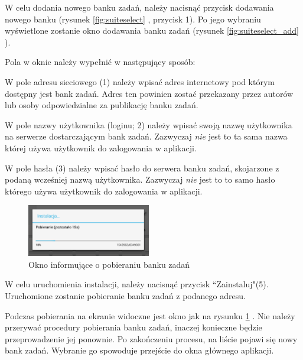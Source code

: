 \documentclass[a4paper,10pt,twosided]{book}
\newcommand{\refwithpage}[3]{
\ref{#1}\ifthenelse{\equal{\thepage}{\pageref{#1}}}{}{#2\pageref{#1}#3}%
}
\newcommand{\pref}[1]{\refwithpage{#1}{ (strona }{)}}
\newcommand{\ppref}[1]{\refwithpage{#1}{ -- strona }{}}
\begin{document}
W celu dodania nowego banku zadań, należy nacisnąć przycisk dodawania nowego banku (rysunek \ppref{fig:suiteselect}, przycisk 1). Po jego wybraniu wyświetlone zostanie okno dodawania banku zadań (rysunek \ppref{fig:suiteselect_add}).

Pola w oknie należy wypełnić w następujący sposób:

W pole adresu sieciowego (1) należy wpisać adres internetowy pod którym dostępny jest bank zadań. Adres ten powinien zostać przekazany przez autorów lub osoby odpowiedzialne za publikację banku zadań.

W pole nazwy użytkownika (loginu; 2) należy wpisać swoją nazwę użytkownika na serwerze dostarczającym bank zadań. Zazwyczaj \emph{nie} jest to ta sama nazwa której używa użytkownik do zalogowania w aplikacji.

W pole hasła (3) należy wpisać hasło do serwera banku zadań, skojarzone z podaną wcześniej nazwą użytkownika. Zazwyczaj \emph{nie} jest to to samo hasło którego używa użytkownik do zalogowania w aplikacji.

\begin{figure}
\vspace{-1em}
\includegraphics[width=0.48\textwidth]{activity_suite_select-installing.png}
\caption{Okno informujące o pobieraniu banku zadań}
\vspace{-1em}
\label{fig:suiteselect_installation}
\end{figure}

W celu uruchomienia instalacji, należy nacisnąć przycisk ``Zainstaluj"\hspace{1em}(5). Uruchomione zostanie pobieranie banku zadań z podanego adresu. 

Podczas pobierania na ekranie widoczne jest okno jak na rysunku \pref{fig:suiteselect_installation}. Nie należy przerywać procedury pobierania banku zadań, inaczej konieczne będzie przeprowadzenie jej ponownie.
Po zakończeniu procesu, na liście pojawi się nowy bank zadań. Wybranie go spowoduje przejście do okna głównego aplikacji.
\end{document}
